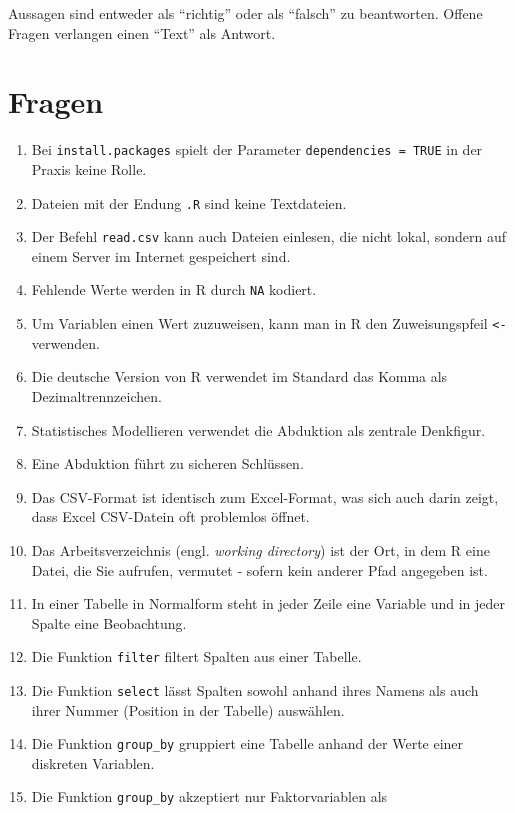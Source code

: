 \documentclass[12pt,ngerman,]{book}
\begin{document}
Aussagen sind entweder als ``richtig'' oder als ``falsch'' zu
beantworten. Offene Fragen verlangen einen ``Text'' als Antwort.

\section{Fragen}\label{fragen}

\begin{enumerate}
\def\labelenumi{\arabic{enumi}.}
\item
  Bei \texttt{install.packages} spielt der Parameter
  \texttt{dependencies\ =\ TRUE} in der Praxis keine Rolle.
\item
  Dateien mit der Endung \texttt{.R} sind keine Textdateien.
\item
  Der Befehl \texttt{read.csv} kann auch Dateien einlesen, die nicht
  lokal, sondern auf einem Server im Internet gespeichert sind.
\item
  Fehlende Werte werden in R durch \texttt{NA} kodiert.
\item
  Um Variablen einen Wert zuzuweisen, kann man in R den Zuweisungspfeil
  \texttt{\textless{}-} verwenden.
\item
  Die deutsche Version von R verwendet im Standard das Komma als
  Dezimaltrennzeichen.
\item
  Statistisches Modellieren verwendet die Abduktion als zentrale
  Denkfigur.
\item
  Eine Abduktion führt zu sicheren Schlüssen.
\item
  Das CSV-Format ist identisch zum Excel-Format, was sich auch darin
  zeigt, dass Excel CSV-Datein oft problemlos öffnet.
\item
  Das Arbeitsverzeichnis (engl. \emph{working directory}) ist der Ort,
  in dem R eine Datei, die Sie aufrufen, vermutet - sofern kein anderer
  Pfad angegeben ist.
\item
  In einer Tabelle in Normalform steht in jeder Zeile eine Variable und
  in jeder Spalte eine Beobachtung.
\item
  Die Funktion \texttt{filter} filtert Spalten aus einer Tabelle.
\item
  Die Funktion \texttt{select} lässt Spalten sowohl anhand ihres Namens
  als auch ihrer Nummer (Position in der Tabelle) auswählen.
\item
  Die Funktion \texttt{group\_by} gruppiert eine Tabelle anhand der
  Werte einer diskreten Variablen.
\item
  Die Funktion \texttt{group\_by} akzeptiert nur Faktorvariablen als

\end{enumerate}
\end{document}
